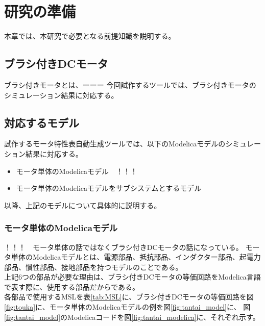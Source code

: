 \chapter{研究の準備}\label{cha:Preparation}
本章では、本研究で必要となる前提知識を説明する。
\section{ブラシ付きDCモータ}\label{}
ブラシ付きモータとは、ーーー
今回試作するツールでは、ブラシ付きモータのシミュレーション結果に対応する。

\section{対応するモデル}\label{taioumodel}
試作するモータ特性表自動生成ツールでは、以下のModelicaモデルのシミュレーション結果に対応する。
\begin{itemize}
	\item モータ単体のModelicaモデル　！！！
	\item モータ単体のModelicaモデルをサブシステムとするモデル
\end{itemize}
以降、上記のモデルについて具体的に説明する。

\subsection{モータ単体のModelicaモデル}\label{sub:tanntai}
！！！　モータ単体の話ではなくブラシ付きDCモータの話になっている。
モータ単体のModelicaモデルとは、電源部品、抵抗部品、インダクター部品、起電力部品、慣性部品、接地部品を持つモデルのことである。\\
上記6つの部品が必要な理由は、ブラシ付きDCモータの等価回路\cite{等価回路}をModelica言語で表す際に、使用する部品\cite{modelicaシステム本}だからである。\\
各部品で使用するMSLを表\ref{tab:MSL}に、ブラシ付きDCモータの等価回路を図\ref{fig:touka}に、モータ単体のModelicaモデルの例を図\ref{fig:tantai_model}に、
図\ref{fig:tantai_model}のModelicaコードを図\ref{fig:tantai_modelica}に、それぞれ示す。


